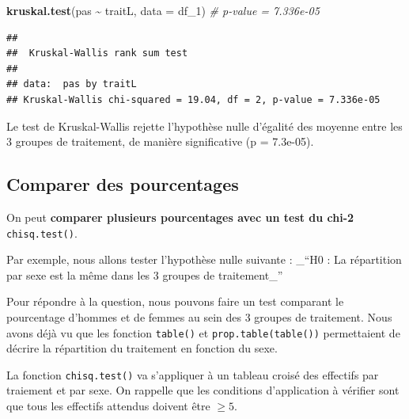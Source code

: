 \documentclass[
]{book}
\newenvironment{Shaded}{\begin{snugshade}}{\end{snugshade}}
\newcommand{\AttributeTok}[1]{\textcolor[rgb]{0.13,0.29,0.53}{#1}}
\newcommand{\CommentTok}[1]{\textcolor[rgb]{0.56,0.35,0.01}{\textit{#1}}}
\newcommand{\ConstantTok}[1]{\textcolor[rgb]{0.56,0.35,0.01}{#1}}
\newcommand{\DocumentationTok}[1]{\textcolor[rgb]{0.56,0.35,0.01}{\textbf{\textit{#1}}}}
\newcommand{\FunctionTok}[1]{\textcolor[rgb]{0.13,0.29,0.53}{\textbf{#1}}}
\newcommand{\NormalTok}[1]{#1}
\newcommand{\OtherTok}[1]{\textcolor[rgb]{0.56,0.35,0.01}{#1}}
\newcommand{\SpecialCharTok}[1]{\textcolor[rgb]{0.81,0.36,0.00}{\textbf{#1}}}
\begin{document}
\begin{Shaded}
\begin{Highlighting}[]
\FunctionTok{kruskal.test}\NormalTok{(pas }\SpecialCharTok{\textasciitilde{}}\NormalTok{ traitL, }\AttributeTok{data =}\NormalTok{ df\_1) }\CommentTok{\# p{-}value = 7.336e{-}05}
\end{Highlighting}
\end{Shaded}

\begin{verbatim}
## 
##  Kruskal-Wallis rank sum test
## 
## data:  pas by traitL
## Kruskal-Wallis chi-squared = 19.04, df = 2, p-value = 7.336e-05
\end{verbatim}

Le test de Kruskal-Wallis rejette l'hypothèse nulle d'égalité des moyenne entre les 3 groupes de traitement, de manière significative (p = 7.3e-05).

\subsection{Comparer des pourcentages}\label{comparer-des-pourcentages}

On peut \textbf{comparer plusieurs pourcentages avec un test du chi-2} \texttt{chisq.test()}.

Par exemple, nous allons tester l'hypothèse nulle suivante :
\_``H0 : La répartition par sexe est la même dans les 3 groupes de traitement\_''

Pour répondre à la question, nous pouvons faire un test comparant le pourcentage d'hommes et de femmes au sein des 3 groupes de traitement. Nous avons déjà vu que les fonction \texttt{table()} et \texttt{prop.table(table())} permettaient de décrire la répartition du traitement en fonction du sexe.

La fonction \texttt{chisq.test()} va s'appliquer à un tableau croisé des effectifs par traiement et par sexe. On rappelle que les conditions d'application à vérifier sont que tous les effectifs attendus doivent être \(\geq 5\).

\begin{Shaded}
\end{Shaded}
\end{document}
